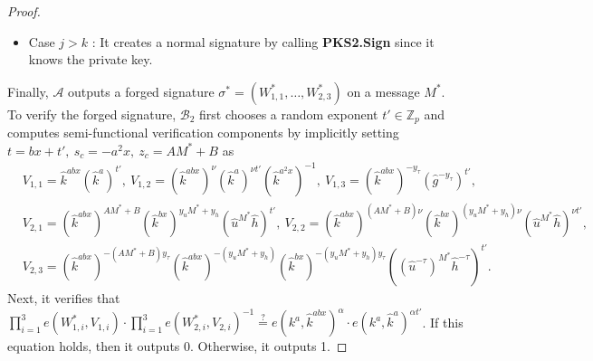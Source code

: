 \documentclass[11pt,letterpaper]{article}
\newcommand{\Z}{\mathbb{Z}}
\newcommand{\mc}[1]{\mathcal{#1}}
\newcommand{\tb}[1]{\textbf{#1}}
\begin{document}
\begin{proof}
\begin{itemize}
\item {Case $j > k$} : It creates a normal signature by calling
    \tb{PKS2.Sign} since it knows the private key.
\end{itemize}

\noindent Finally, $\mc{A}$ outputs a forged signature $\sigma^* =
(W_{1,1}^*, \ldots, W_{2,3}^*)$ on a message $M^*$. To verify the forged
signature, $\mc{B}_2$ first chooses a random exponent $t' \in \Z_p$ and
computes semi-functional verification components by implicitly setting
    $t = bx + t',~ s_c = -a^2 x,~ z_c = A M^* + B$
as
    \begin{align*}
    &   V_{1,1} = \hat{k}^{abx} (\hat{k}^a)^{t'},~
        V_{1,2} = (\hat{k}^{abx})^{\nu} (\hat{k}^a)^{\nu t'} (\hat{k}^{a^2x})^{-1},~
        V_{1,3} = (\hat{k}^{abx})^{-y_{\tau}} (\hat{g}^{-y_{\tau}})^{t'}, \\
    &   V_{2,1} = (\hat{k}^{abx})^{A M^* + B} (\hat{k}^{bx})^{y_u M^* + y_h}
                  (\hat{u}^{M^*} \hat{h})^{t'},~
        V_{2,2} = (\hat{k}^{abx})^{(A M^* + B) \nu}
                  (\hat{k}^{bx})^{(y_u M^* + y_h) \nu}
                  (\hat{u}^{M^*} \hat{h})^{\nu t'},~ \\
    &   V_{2,3} = (\hat{k}^{abx})^{-(A M^* + B) y_{\tau}}
                  (\hat{k}^{abx})^{-(y_u M^* + y_h)}
                  (\hat{k}^{bx})^{-(y_u M^* + y_h) y_{\tau}}
                  ((\hat{u}^{-\tau})^{M^*} \hat{h}^{-\tau})^{t'}.
    \end{align*}
Next, it verifies that
    $\prod_{i=1}^3 e(W_{1,i}^*, V_{1,i}) \cdot
    \prod_{i=1}^3 e(W_{2,i}^*, V_{2,i})^{-1} \stackrel{?}{=}
    e(k^a, \hat{k}^{abx})^{\alpha} \cdot e(k^a, \hat{k}^a)^{\alpha t'}$.
If this equation holds, then it outputs 0. Otherwise, it outputs 1.


\end{proof}
\end{document}
